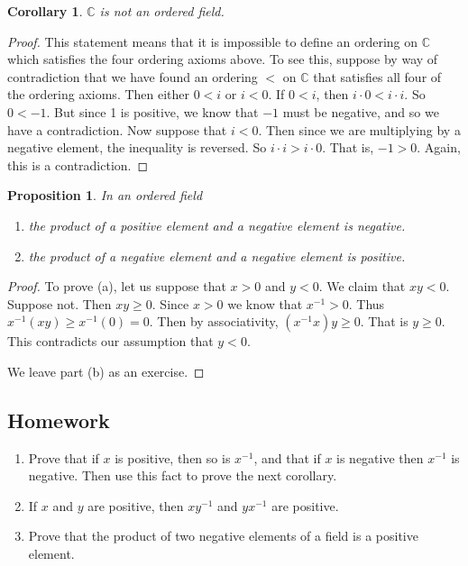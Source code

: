 \documentclass[11pt]{article}
\newtheorem{proposition}[theorem]{Proposition}
\newtheorem{corollary}[theorem]{Corollary}
\theoremstyle{definition}
\begin{document}
\begin{corollary}
  $\mathbb{C}$ is not an ordered field.
\end{corollary}
\begin{proof}
  This statement means that it is impossible to define an ordering on $\mathbb{C}$ which satisfies the four ordering axioms above. To see this, suppose
  by way of contradiction that we have found an ordering $<$ on $\mathbb{C}$ that satisfies all four of the ordering axioms. Then either $0< i$ or $i < 0$.
  If $0 < i$, then $i\cdot 0 < i\cdot i$. So $0 < -1$. But since 1 is positive, we know that $-1$ must be negative, and so we have a contradiction.
  Now suppose that $i < 0$. Then since we are multiplying by a negative element, the inequality is reversed. So $i\cdot i > i\cdot 0$. That is, 
  $-1 > 0$. Again, this is a contradiction.
\end{proof}

\begin{proposition} In an ordered field
  \begin{enumerate}
    \item[(a)] the product of a positive element and a negative element is negative.
    \item[(b)] the product of a negative element and a negative element is positive.
  \end{enumerate}
\end{proposition}
\begin{proof}
  To prove (a), let us suppose that $x > 0$ and $y < 0$. We claim that $xy < 0$. Suppose not. Then $xy \geq 0$. Since $x > 0$ we know that
  $x^{-1} > 0$. Thus $x^{-1}(xy) \geq x^{-1}(0) = 0$. Then by associativity, $(x^{-1}x)y \geq 0$. That is $y \geq 0$. This 
  contradicts our assumption that $y < 0$.

  We leave part (b) as an exercise.
\end{proof}


\newpage \subsection{Homework}  

\begin{enumerate}

  \item Prove that if $x$ is positive, then so is $x^{-1}$, and that if $x$ is negative then $x^{-1}$ is negative. Then use this fact to prove the next corollary.

  \item If $x$ and $y$ are positive, then $xy^{-1}$ and $yx^{-1}$ are positive.

  \item Prove that the product of two negative elements of a field is a positive element.

\end{enumerate}
\end{document}
